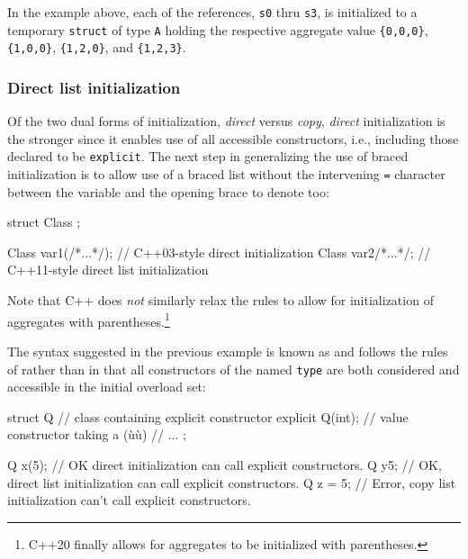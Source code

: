 In the example above, each of the references, \lstinline!s0! thru
\lstinline!s3!, is initialized to a temporary \lstinline!struct! of type
\lstinline!A! holding the respective aggregate value \lstinline!{0,0,0}!,
\lstinline!{1,0,0}!, \lstinline!{1,2,0}!, and \lstinline!{1,2,3}!.

\subsubsection[Direct list initialization]{Direct list initialization}\label{direct-list-initialization}

Of the two dual forms of initialization, \emph{direct} versus
\emph{copy}, \emph{direct} initialization is the stronger since it
enables use of all accessible constructors, i.e., including those
declared to be \lstinline!explicit!. The next step in generalizing the use
of braced initialization is to allow use of a braced list without the
intervening \lstinline!=! character between the variable and the opening
brace to denote  too:

\begin{emcppshiddenlisting}[emcppsbatch=e12]
struct Class {};
\end{emcppshiddenlisting}
\begin{emcppslisting}[emcppsbatch=e12]
Class var1(/*...*/);  // C++03-style direct initialization
Class var2{/*...*/};  // C++11-style direct list initialization
\end{emcppslisting}
    

\noindent Note that C++ does \emph{not} similarly relax the rules to allow for
initialization of aggregates with parentheses.\footnote{C++20 finally allows for aggregates to be
initialized with parentheses.}

The syntax suggested in the previous example is known as  and follows the rules of  rather than  in that all
constructors of the named \lstinline!type! are both considered and
accessible in the initial overload set:

\begin{emcppslisting}[emcppsbatch=e13]
struct Q  // class containing explicit constructor
{
    explicit Q(int);  // value constructor taking a (ù{}ù)
    // ...
};

Q x(5);    // OK  direct initialization can call explicit constructors.
Q y{5};    // OK, direct list initialization can call explicit constructors.
Q z = {5}; // Error, copy list initialization can't call explicit constructors.
\end{emcppslisting}
    

